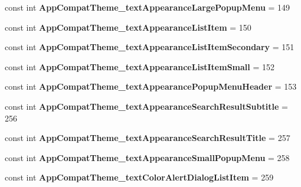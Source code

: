 \begin{DoxyCompactItemize}
const int {\bfseries App\+Compat\+Theme\+\_\+text\+Appearance\+Large\+Popup\+Menu} = 149
\item 
\mbox{\label{classst_delivery_1_1_resource_1_1_styleable_ae103d4dd3a8815754ee8b887fe4b3dc4}} 
const int {\bfseries App\+Compat\+Theme\+\_\+text\+Appearance\+List\+Item} = 150
\item 
\mbox{\label{classst_delivery_1_1_resource_1_1_styleable_adb56163e3c55c4ce4dbf82f1086065ce}} 
const int {\bfseries App\+Compat\+Theme\+\_\+text\+Appearance\+List\+Item\+Secondary} = 151
\item 
\mbox{\label{classst_delivery_1_1_resource_1_1_styleable_a794708caee6f8af4a96af2358d7f08c3}} 
const int {\bfseries App\+Compat\+Theme\+\_\+text\+Appearance\+List\+Item\+Small} = 152
\item 
\mbox{\label{classst_delivery_1_1_resource_1_1_styleable_acc2336bc4d13c9561dfaccb0e3123541}} 
const int {\bfseries App\+Compat\+Theme\+\_\+text\+Appearance\+Popup\+Menu\+Header} = 153
\item 
\mbox{\label{classst_delivery_1_1_resource_1_1_styleable_a69bb06655676ed2ba859d12e97ca1b8a}} 
const int {\bfseries App\+Compat\+Theme\+\_\+text\+Appearance\+Search\+Result\+Subtitle} = 256
\item 
\mbox{\label{classst_delivery_1_1_resource_1_1_styleable_a1117c600ac04d652d5ceb890a2b2b5f7}} 
const int {\bfseries App\+Compat\+Theme\+\_\+text\+Appearance\+Search\+Result\+Title} = 257
\item 
\mbox{\label{classst_delivery_1_1_resource_1_1_styleable_ad76ab8c378805606bd455b548473cdce}} 
const int {\bfseries App\+Compat\+Theme\+\_\+text\+Appearance\+Small\+Popup\+Menu} = 258
\item 
\mbox{\label{classst_delivery_1_1_resource_1_1_styleable_ae126229e8a3ebb037766259cdca36c36}} 
const int {\bfseries App\+Compat\+Theme\+\_\+text\+Color\+Alert\+Dialog\+List\+Item} = 259

\end{DoxyCompactItemize}
